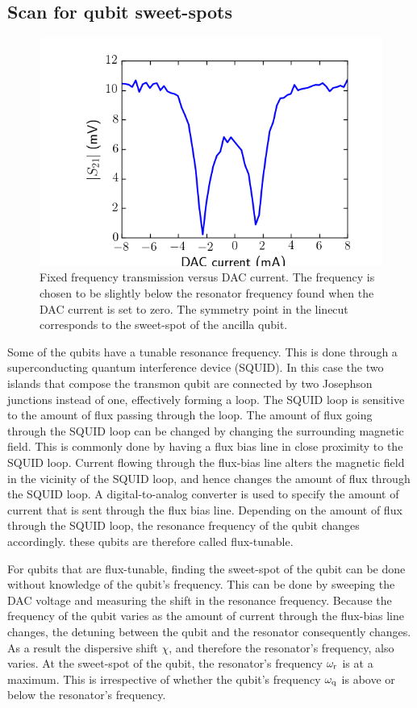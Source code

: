       \subsection{Scan for qubit sweet-spots}

        \begin{figure}[tb]
          \centering
          \includegraphics[width=.6\linewidth]{../Figures/Qubit characterization/Resonator vs DAC linecut.png}
          \caption{Fixed frequency transmission versus DAC current. The frequency is chosen to be slightly below the resonator frequency found when the DAC current is set to zero. The symmetry point in the linecut corresponds to the sweet-spot of the ancilla qubit.}
          \label{fig:figure1}
        \end{figure}
        Some of the qubits have a tunable resonance frequency. This is done through a superconducting quantum interference device (SQUID). In this case the two islands that compose the transmon qubit are connected by two Josephson junctions instead of one, effectively forming a loop. The SQUID loop is sensitive to the amount of flux passing through the loop. The amount of flux going through the SQUID loop can be changed by changing the surrounding magnetic field. This is commonly done by having a flux bias line in close proximity to the SQUID loop. Current flowing through the flux-bias line alters the magnetic field in the vicinity of the SQUID loop, and hence changes the amount of flux through the SQUID loop. A digital-to-analog converter is used to specify the amount of current that is sent through the flux bias line. Depending on the amount of flux through the SQUID loop, the resonance frequency of the qubit changes accordingly. these qubits are therefore called flux-tunable.

        For qubits that are flux-tunable, finding the sweet-spot of the qubit can be done without knowledge of the qubit's frequency. This can be done by sweeping the DAC voltage and measuring the shift in the resonance frequency. Because the frequency of the qubit varies as the amount of current through the flux-bias line changes, the detuning between the qubit and the resonator consequently changes. As a result the dispersive shift $\chi$, and therefore the resonator's frequency, also varies. At the sweet-spot of the qubit, the resonator's frequency $\omega_\text{r}$ is at a maximum. This is irrespective of whether the qubit's frequency $\omega_\text{q}$ is above or below the resonator's frequency.

